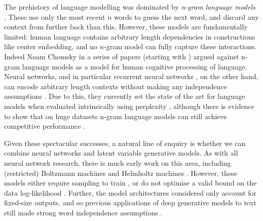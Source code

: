The prehistory of language modelling was dominated by \textit{n-gram language models} \citep{Jelinek:76,Baker:90}. These use only the most recent $n$ words to guess the next word, and discard any context from further back than this. However, these models are fundamentally limited: human language contains arbitrary length dependencies in constructions like center embedding, and no $n$-gram model can fully capture these interactions. Indeed Noam Chomsky in a series of papers (starting with \citet{Chomsky:56}) argued against n-gram language models as a model for human cognitive processing of language. Neural networks, and in particular recurrent neural networks \citep{Elman:90,Hochreiter:97}, on the other hand, can encode arbitrary length contexts without making any independence assumptions \citep{Mikolov:10,Sundermeyer:12}. Due to this, they currently set the state of the art for language models when evaluated intrinsically using perplexity \citep{Melis:18}, although there is evidence to show that on huge datasets n-gram language models can still achieve competitive performance \citep{Chelba:17}.


Given these spectacular successes, a natural line of enquiry is whether we can combine neural networks and latent variable generative models. As with all neural network research, there is much early work on this area, including (restricted) Boltzmann machines \citep{Hinton:83,Ackley:85,Smolensky:86} and Helmholtz machines \citep{Dayan:95}. However, these models either require sampling to train \citep{Hinton:02,Tieleman:08}, or do not optimise a valid bound on the data log-likelihood \citep{Hinton:95}. Further, the model architectures considered only account for fixed-size outputs, and so previous applications of deep generative models to text still made strong word independence assumptions \citep{Hinton:09}.

